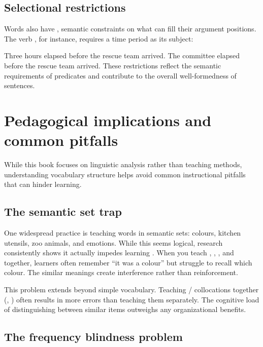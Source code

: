 \subsection{Selectional restrictions}

Words also have , semantic constraints on what can fill their argument positions. The verb , for instance, requires a time period as its subject:

\ea
\ea Three hours elapsed before the rescue team arrived.
\ex *The committee elapsed before the rescue team arrived.
\z\z
These restrictions reflect the semantic requirements of predicates and contribute to the overall well-formedness of sentences.

\section{Pedagogical implications and common pitfalls}

While this book focuses on linguistic analysis rather than teaching methods, understanding vocabulary structure helps avoid common instructional pitfalls that can hinder learning.

\subsection{The semantic set trap}

One widespread practice is teaching words in semantic sets: colours, kitchen utensils, zoo animals, and emotions. While this seems logical, research consistently shows it actually impedes learning \citep{finkbeiner2003semantic, waring1997negative}. When you teach , , , and  together, learners often remember \enquote{it was a colour} but struggle to recall which colour. The similar meanings create interference rather than reinforcement.

This problem extends beyond simple vocabulary. Teaching / collocations together (, ) often results in more errors than teaching them separately. The cognitive load of distinguishing between similar items outweighs any organizational benefits.

\subsection{The frequency blindness problem}\label{sec:opportunity-cost}

